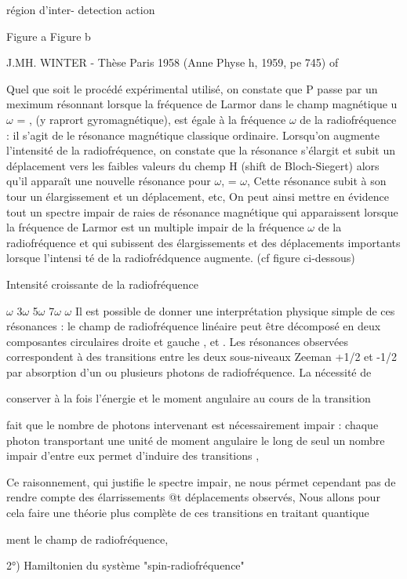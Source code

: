 région d'inter- detection
action

Figure a Figure b

J.MH. WINTER - Thèse Paris 1958 (Anne Physe h, 1959, pe 745) of

 

Quel que soit le procédé expérimental utilisé, on constate que P
passe par un meximum résonnant lorsque la fréquence de Larmor dans le champ
magnétique  u$\omega$ = , (y raprort gyromagnétique), est égale à la fréquence
$\omega$ de la radiofréquence : il s'agit de le résonance magnétique classique ordinaire. Lorsqu'on augmente l'intensité de la radiofréquence, on constate que
la résonance  s'élargit et subit un déplacement vers les faibles valeurs du chemp H (shift de Bloch-Siegert) alors qu'il apparaît une nouvelle
résonance pour $\omega$, = $\omega$, Cette résonance subit à son tour un élargissement et
un déplacement, etc, On peut ainsi mettre en évidence tout un spectre impair
de raies de résonance magnétique qui apparaissent lorsque la fréquence de
Larmor est un multiple impair de la fréquence $\omega$ de la radiofréquence et qui
subissent des élargissements et des déplacements importants lorsque l'intensi
té de la radiofrédquence augmente. (cf figure ci-dessous)

Intensité croissante
de la radiofréquence

 $\omega$ 3$\omega$ 5$\omega$ 7$\omega$ $\omega$
Il est possible de donner une interprétation physique simple de ces
résonances : le champ de radiofréquence linéaire peut être décomposé en deux
composantes circulaires droite et gauche , et . Les résonances observées correspondent à des transitions entre les deux sous-niveaux Zeeman +1/2 et -1/2
par absorption d'un ou plusieurs photons de radiofréquence. La nécessité de

conserver à la fois l'énergie et le moment angulaire au cours de la transition

fait que le nombre de photons intervenant est nécessairement impair : chaque
photon transportant une unité de moment angulaire le long de seul un
nombre impair d'entre eux permet d'induire des transitions ,

Ce raisonnement, qui justifie le spectre impair, ne nous pérmet cependant pas
de rendre compte des élarrissements @t déplacements observés, Nous allons pour
cela faire une théorie plus complète de ces transitions en traitant quantique

ment le champ de radiofréquence,

2°) Hamiltonien du système "spin-radiofréquence"

